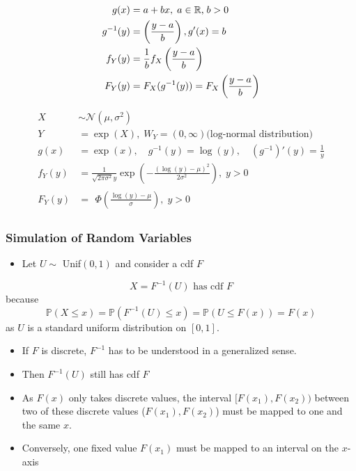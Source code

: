 \begin{align*}
    g(x)      & =a+bx,\;a\in\mathbb{R}\text,\;b>0           \\
    g^{-1}(y) & =\left(\frac{y-a}b\right), g'(x)=b          \\
    f_Y(y)    & =\frac1bf_X\left(\frac{y-a}b\right)         \\
    F_Y(y)    & =F_X(g^{-1}(y))=F_X\left(\frac{y-a}b\right)
\end{align*}

\begin{align*}
    X      & \sim\mathcal{N}(\mu,\sigma^2)                                                              \\
    Y      & =\exp(X),\;W_Y=(0,\infty) \text{(log-normal distribution)}                                 \\
    g(x)   & =\exp(x),\quad g^{-1}(y)=\log(y),\quad(g^{-1})'(y)=\frac{1}{y}                             \\
    f_Y(y) & =\frac{1}{\sqrt{2\pi\sigma^2}y}\exp\left(-\frac{{(\log(y)-\mu)}^2}{2\sigma^2}\right),\;y>0 \\
    F_Y(y) & =\begin{aligned}\Phi\left(\frac{\log(y)-\mu}\sigma\right),\;y>0\end{aligned}
\end{align*}

\subsubsection{Simulation of Random Variables}

\begin{itemize}
    \item Let $U\sim$ Unif$(0,1)$ and consider a cdf $F$
\end{itemize}
\begin{equation*}
    X=F^{-1}(U) \text{ has cdf }F
\end{equation*}
because
\begin{equation*}
    \mathbb{P}(X\leq x)=\mathbb{P}(F^{-1}(U)\leq x)=\mathbb{P}(U\leq F(x))=F(x)
\end{equation*}
as $U$ is a standard uniform distribution on $[0,1]$.


\begin{itemize}
    \item If $F$ is discrete, $F^{-1}$ has to be understood in a generalized sense.
    \item Then $F^{-1}(U)$ still has cdf $F$
    \item As $F(x)$ only takes discrete values, the interval $[F(x_1), F(x_2))$ between two of these discrete values ($F(x_1), F(x_2)$) must be mapped to one and the same $x$. %
    \item Conversely, one fixed value $F(x_1)$ must be mapped to an interval on the $x$-axis
\end{itemize}

